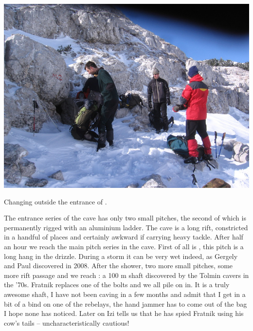 \begin{pagefigure}
\checkoddpage \ifoddpage \forcerectofloat \else \forceversofloat \fi
   \centering
\includegraphics[width = \textwidth]{2011/super_action/Jarvist M Frost - Canon A520 - M2 Super Action - 2011-10-22-11.04.54-IMG_0202--orig.jpg}
\caption{Changing outside the entrance of . } \label{M2 october}
\end{pagefigure}

The entrance series of the cave has only two small pitches, the second
of which is permanently rigged with an aluminium ladder. The cave is a
long rift, constricted in a handful of places and certainly awkward if
carrying heavy tackle. After half an hour we reach the main pitch series
in the cave. First of all is , this pitch is a long hang
in the drizzle. During a storm it can be very wet indeed, as Gergely and
Paul discovered in 2008. After the shower, two more small pitches, some
more rift passage and we reach : a 100 m shaft discovered by the
Tolmin cavers in the '70s. Fratnik replaces one of the bolts and we all
pile on in. It is a truly awesome shaft, I have not been caving in a few
months and admit that I get in a bit of a bind on one of the rebelays,
the hand jammer has to come out of the bag  I hope none has noticed.
Later on Izi tells us that he has spied Fratnik using his cow's tails -- uncharacteristically cautious!

